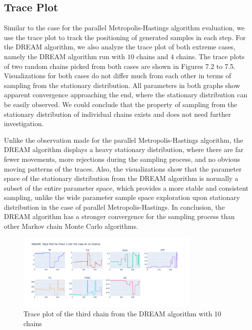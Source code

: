 \subsection{Trace Plot}
Similar to the case for the parallel Metropolis-Hastings algorithm evaluation, we use the trace plot to track the positioning of generated samples in each step. For the DREAM algorithm, we also analyze the trace plot of both extreme cases, namely the DREAM algorithm run with $10$ chains and $4$ chains. The trace plots of two random chains picked from both cases are shown in Figures 7.2 to 7.5. Visualizations for both cases do not differ much from each other in terms of sampling from the stationary distribution. All parameters in both graphs show apparent convergence approaching the end, where the stationary distribution can be easily observed. We could conclude that the property of sampling from the stationary distribution of individual chains exists and does not need further investigation.

Unlike the observation made for the parallel Metropolis-Hastings algorithm, the DREAM algorithm displays a heavy stationary distribution, where there are far fewer movements, more rejections during the sampling process, and no obvious moving patterns of the traces. Also, the visualizations show that the parameter space of the stationary distribution from the DREAM algorithm is normally a subset of the entire parameter space, which provides a more stable and consistent sampling, unlike the wide parameter sample space exploration upon stationary distribution in the case of parallel Metropolis-Hastings. In conclusion, the DREAM algorithm has a stronger convergence for the sampling process than other Markov chain Monte Carlo algorithms.

\begin{figure}[H]
    \centering
    \includegraphics[width=0.8\textwidth]{figures/dream/tp_rand_10_3.png}
    \captionsetup{width=.8\textwidth}
    \caption{Trace plot of the third chain from the DREAM algorithm with 10 chains}
    \label{fig:enter-label}
\end{figure}

